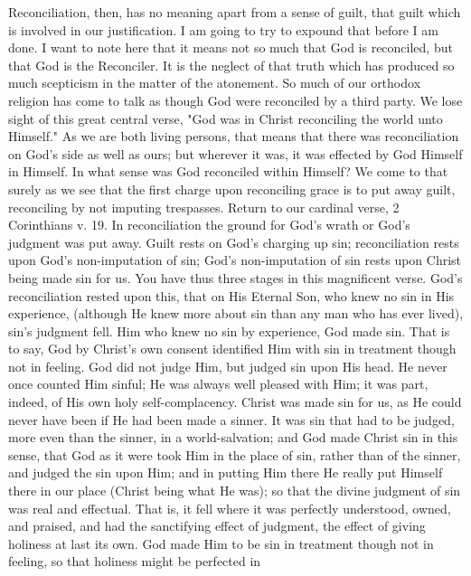 \documentclass[12pt,letterpaper,oneside]{book}
\begin{document}
Reconciliation, then, has no meaning apart 
from a sense of guilt, that guilt which is involved 
in our justification. I am going to try to 
expound that before I am done. I want to note 
here that it means not so much that God is reconciled,
but that God is the Reconciler. It is the 
neglect of that truth which has produced so much 
scepticism in the matter of the atonement. So 
much of our orthodox religion has come to talk 
as though God were reconciled by a third party. 
We lose sight of this great central verse, 
"God was in Christ reconciling the world unto 
Himself." As we are both living persons, that 
means that there was reconciliation on God's 
side as well as ours; but wherever it was, it was 
effected by God Himself in Himself. In what 
sense was God reconciled within Himself? We 
come to that surely as we see that the first 
charge upon reconciling grace is to put away 
guilt, reconciling by not imputing trespasses. 
Return to our cardinal verse, 2 Corinthians 
v. 19. In reconciliation the ground for 
God's wrath or God's judgment was put away. 
Guilt rests on God's charging up sin; reconciliation 
rests upon God's non-imputation 
of sin; God's non-imputation of sin rests upon 
Christ being made sin for us. You have thus 
three stages in this magnificent verse. God's 
reconciliation rested upon this, that on His 
Eternal Son, who knew no sin in His experience, 
(although He knew more about sin than any 
man who has ever lived), sin's judgment fell. 
Him who knew no sin by experience, God made 
sin. That is to say, God by Christ's own consent 
identified Him with sin in treatment though 
not in feeling. God did not judge Him, but 
judged sin upon His head. He never once 
counted Him sinful; He was always well 
pleased with Him; it was part, indeed, of His 
own holy self-complacency. Christ was made sin 
for us, as He could never have been if He had 
been made a sinner. It was sin that had to be 
judged, more even than the sinner, in a world-salvation; 
and God made Christ sin in this sense, 
that God as it were took Him in the place of sin, 
rather than of the sinner, and judged the sin 
upon Him; and in putting Him there He really 
put Himself there in our place (Christ being 
what He was); so that the divine judgment of 
sin was real and effectual. That is, it fell where 
it was perfectly understood, owned, and praised, 
and had the sanctifying effect of judgment, the 
effect of giving holiness at last its own. God 
made Him to be sin in treatment though not 
in feeling, so that holiness might be perfected in 
\end{document}
